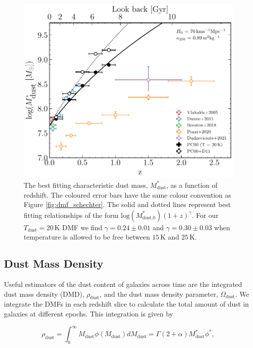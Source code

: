 \begin{figure}
	\centering
	\includegraphics[width=0.7\columnwidth]{Figures/dmf_m_evolution.pdf}
	\caption[Evolution of the characteristic dust mass, $M_\textrm{dust}^*$, as a function of redshift]{The best fitting characteristic dust mass, $M_\textrm{dust}^*$, as a function of redshift. The coloured error bars have the same colour convention as Figure \ref{fig:dmf_schechter}. The solid and dotted lines represent best fitting relationships of the form $\textrm{log}(M_{\textrm{dust,0}}^*)(1+z)^\gamma$. For our $T_{\textrm{dust}} = 20\,$K DMF we find $\gamma = 0.24\pm0.01$ and $\gamma = 0.30\pm0.03$ when temperature is allowed to be free between $15\,$K and $25\,$K.}
	\label{fig:dmf_m_evolution}
\end{figure}

\subsection{Dust Mass Density}

Useful estimators of the dust content of galaxies across time are the integrated dust mass density (DMD), $\rho_{\textrm{dust}}$, and the dust mass density parameter, $\Omega_{\textrm{dust}}$. We integrate the DMFs in each redshift slice to calculate the total amount of dust in galaxies at different epochs. This integration is given by

\begin{equation}
    \rho_{\textrm{dust}} = \int_0^\infty M_{\textrm{dust}} \phi(M_{\textrm{dust}}) dM_{\textrm{dust}} = \Gamma(2+\alpha) M_{\textrm{dust}}^* \phi^*,
    \label{eq:dust_mass_density}
\end{equation}


